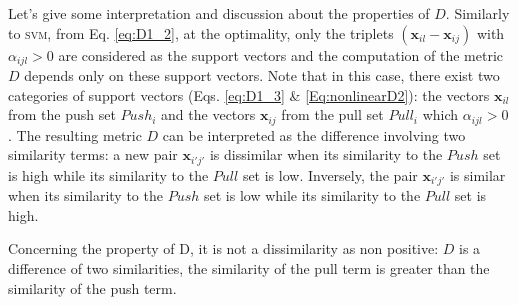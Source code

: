 
\noindent Let's give some interpretation and discussion about the properties of $D$. Similarly to \textsc{svm}, from Eq. \ref{eq:D1_2}, at the optimality, only the triplets $(\textbf{x}_{il}-\textbf{x}_{ij})$ with $\alpha_{ijl} > 0$ are considered as the support vectors and the computation of the metric $D$ depends only on these support vectors. Note that in this case, there exist two categories of support vectors (Eqs. \ref{eq:D1_3} \& \ref{Eq:nonlinearD2}): the vectors $\textbf{x}_{il}$ from the push set $Push_i$ and the vectors $\textbf{x}_{ij}$ from the pull set $Pull_i$ which $\alpha_{ijl} > 0$. The resulting metric $D$ can be interpreted as the difference involving two similarity terms: a new pair $\textbf{x}_{i'j'}$ is dissimilar when its similarity to the $Push$ set is high while its similarity to the $Pull$ set is low. Inversely, the pair $\textbf{x}_{i'j'}$ is similar when its similarity to the $Push$ set is low while its similarity to the $Pull$ set is high.

Concerning the property of  D, it is not a dissimilarity as non positive: $D$ is a difference of two similarities, the similarity of the pull term is greater than the similarity of the push term.

